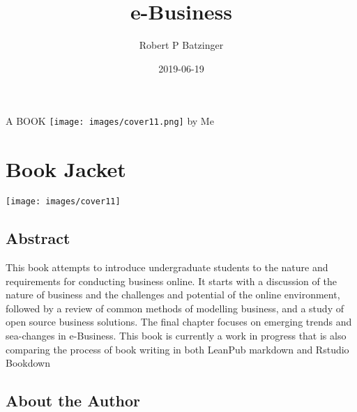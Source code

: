 \documentclass[]{book}
\title{e-Business}
\author{Robert P Batzinger}
\date{2019-06-19}
\let\oldmaketitle\maketitle
\begin{document}
\maketitle

\thispagestyle{empty}
\begin{center}
{\Huge A BOOK}
\texttt{[image: images/cover11.png]}
{\huge by Me}
\end{center}

\let\maketitle\oldmaketitle
\maketitle

{
\setcounter{tocdepth}{1}
\tableofcontents
}
\hypertarget{book-jacket}{%
\chapter*{Book Jacket}\label{book-jacket}}

\texttt{[image: images/cover11]}

\hypertarget{abstract}{%
\section*{Abstract}\label{abstract}}

This book attempts to introduce undergraduate students to the nature and requirements for conducting business online. It starts with a discussion of the nature of business and the challenges and potential of the online environment, followed by a review of common methods of modelling business, and a study of open source business solutions.
The final chapter focuses on emerging trends and sea-changes in e-Business. This book is currently a work in progress that is also comparing the process of book writing in both LeanPub markdown and Rstudio Bookdown

\hypertarget{about-the-author}{%
\section*{About the Author}\label{about-the-author}}
\end{document}
